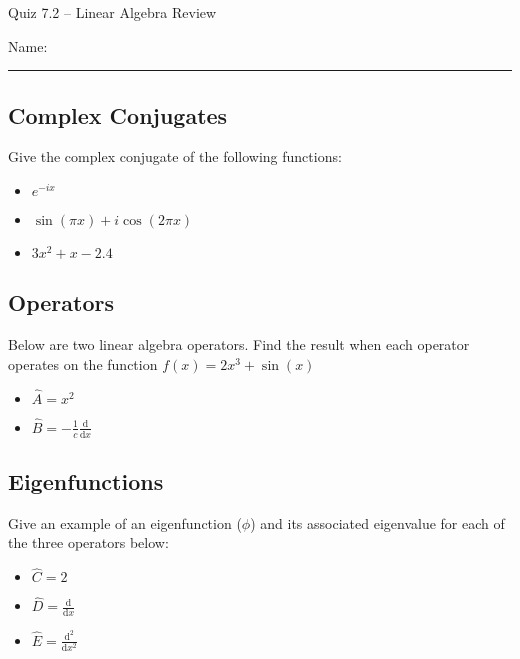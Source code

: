 \documentclass[11pt, letterpaper]{memoir}
\begin{document}
\begin{center}
	{\large Quiz 7.2 --	Linear Algebra Review}
\end{center}
{\large Name: \rule[-1mm]{4in}{.1pt}

\subsection*{Complex Conjugates}
Give the complex conjugate of the following functions:
\begin{itemize}
	\item $e^{-ix}$

	      \vspace{1em}
	\item $\sin(\pi x) + i \cos(2 \pi x)$

	      \vspace{1em}
	\item $3x^2 + x - 2.4$
\end{itemize}

\vspace{1em}
\subsection*{Operators}
Below are two linear algebra operators. Find the result when each operator operates on the function $f(x) = 2x^3 + \sin(x)$
\begin{itemize}
	\item $\hat{A} = x^2$

	      \vspace{1em}
	\item $\hat{B} = -\frac{1}{c}\frac{\mathrm{d}}{\mathrm{d}x}$
\end{itemize}

\vspace{1em}
\subsection*{Eigenfunctions}
Give an example of an eigenfunction ($\phi$) and its associated eigenvalue for each of the three operators below:

\begin{itemize}
	\item $\hat{C} = 2$

	      \vspace{3em}
	\item $\hat{D} = \frac{\mathrm{d}}{\mathrm{d}x}$

	      \vspace{3em}
	\item $\hat{E} = \frac{\mathrm{d}^2}{\mathrm{d}x^2}$
\end{itemize}

}
\end{document}
